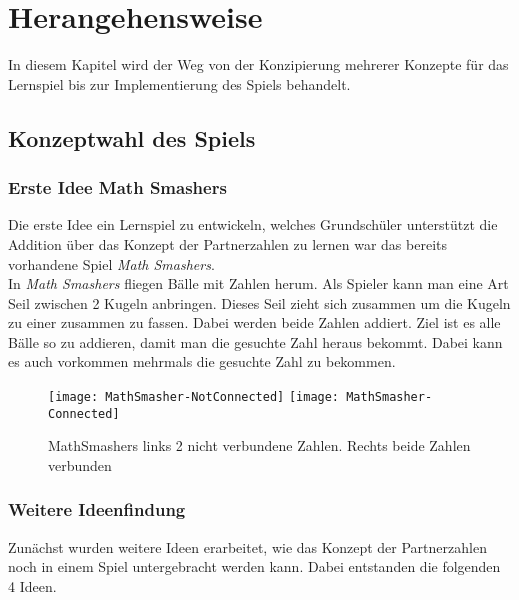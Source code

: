 %
\chapter{Herangehensweise}
In diesem Kapitel wird der Weg von der Konzipierung mehrerer Konzepte für das Lernspiel bis zur Implementierung des Spiels behandelt.
\section{Konzeptwahl des Spiels}
\subsection{Erste Idee Math Smashers}
Die erste Idee ein Lernspiel zu entwickeln, welches Grundschüler unterstützt die Addition über das Konzept der Partnerzahlen zu lernen war das bereits vorhandene Spiel \textit{Math Smashers}.\\
In \textit{Math Smashers} fliegen Bälle mit Zahlen herum. Als Spieler kann man eine Art Seil zwischen 2 Kugeln anbringen. Dieses Seil zieht sich zusammen um die Kugeln zu einer zusammen zu fassen. Dabei werden beide Zahlen addiert. Ziel ist es alle Bälle so zu addieren, damit man die gesuchte Zahl heraus bekommt. Dabei kann es auch vorkommen mehrmals die gesuchte Zahl zu bekommen.
\begin{figure}[htb]
	\centering
	\texttt{[image: MathSmasher-NotConnected]}
	\texttt{[image: MathSmasher-Connected]}
	\caption{MathSmashers links 2 nicht verbundene Zahlen. Rechts beide Zahlen verbunden\label{fig:mathsmashers}}
\end{figure}
\subsection{Weitere Ideenfindung}
Zunächst wurden weitere Ideen erarbeitet, wie das Konzept der Partnerzahlen noch in einem Spiel untergebracht werden kann. Dabei entstanden die folgenden 4 Ideen.
